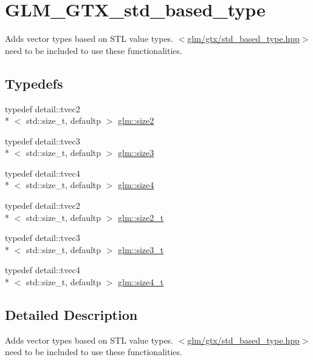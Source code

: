 \hypertarget{group__gtx__std__based__type}{\section{G\-L\-M\-\_\-\-G\-T\-X\-\_\-std\-\_\-based\-\_\-type}
\label{group__gtx__std__based__type}
}


Adds vector types based on S\-T\-L value types. $<$\hyperlink{std__based__type_8hpp}{glm/gtx/std\-\_\-based\-\_\-type.\-hpp}$>$ need to be included to use these functionalities.  


\subsection*{Typedefs}
\begin{DoxyCompactItemize}
\item 
typedef detail\-::tvec2\\*
$<$ std\-::size\-\_\-t, defaultp $>$ \hyperlink{group__gtx__std__based__type_ga393e8beba20ea33452384087a2864f86}{glm\-::size2}
\item 
typedef detail\-::tvec3\\*
$<$ std\-::size\-\_\-t, defaultp $>$ \hyperlink{group__gtx__std__based__type_gae1dda4cdccd4c1abeeb2e470c048d0c9}{glm\-::size3}
\item 
typedef detail\-::tvec4\\*
$<$ std\-::size\-\_\-t, defaultp $>$ \hyperlink{group__gtx__std__based__type_gac04a40cfe44b5035770cf26d98a9349d}{glm\-::size4}
\item 
typedef detail\-::tvec2\\*
$<$ std\-::size\-\_\-t, defaultp $>$ \hyperlink{group__gtx__std__based__type_ga64be170f9203528ff59efa40b1977bb0}{glm\-::size2\-\_\-t}
\item 
typedef detail\-::tvec3\\*
$<$ std\-::size\-\_\-t, defaultp $>$ \hyperlink{group__gtx__std__based__type_gad9ddaab6dd4c37ba46b74a1423ef2ba3}{glm\-::size3\-\_\-t}
\item 
typedef detail\-::tvec4\\*
$<$ std\-::size\-\_\-t, defaultp $>$ \hyperlink{group__gtx__std__based__type_gaaaf9b6a73135945e356601a01beece30}{glm\-::size4\-\_\-t}
\end{DoxyCompactItemize}


\subsection{Detailed Description}
Adds vector types based on S\-T\-L value types. $<$\hyperlink{std__based__type_8hpp}{glm/gtx/std\-\_\-based\-\_\-type.\-hpp}$>$ need to be included to use these functionalities. 

